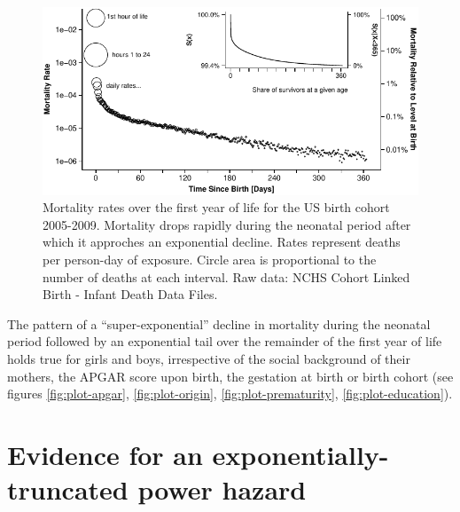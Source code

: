 \documentclass[smallextended]{svjour3} %
\makeatletter
\def\maxwidth{\ifdim\Gin@nat@width>\linewidth\linewidth
\else\Gin@nat@width\fi}
\let\Oldincludegraphics\includegraphics
\renewcommand{\includegraphics}[1]{\Oldincludegraphics[width=\maxwidth]{#1}}
\makeatother
\begin{document}
\begin{figure}
\centering
\includegraphics{fig/plot_imort.pdf}
\caption{\label{fig:plot-imort}Mortality rates over the first year of life
for the US birth cohort 2005-2009. Mortality drops rapidly during the
neonatal period after which it approches an exponential decline. Rates
represent deaths per person-day of exposure. Circle area is proportional
to the number of deaths at each interval. Raw data: NCHS Cohort Linked
Birth - Infant Death Data Files.}
\end{figure}

The pattern of a ``super-exponential'' decline in mortality during the
neonatal period followed by an exponential tail over the remainder of
the first year of life holds true for girls and boys, irrespective of
the social background of their mothers, the APGAR score upon birth, the
gestation at birth or birth cohort (see figures \ref{fig:plot-apgar},
\ref{fig:plot-origin}, \ref{fig:plot-prematurity},
\ref{fig:plot-education}).

\section*{Evidence for an exponentially-truncated power
hazard}\label{evidence-for-an-exponentially-truncated-power-hazard}
\end{document}
